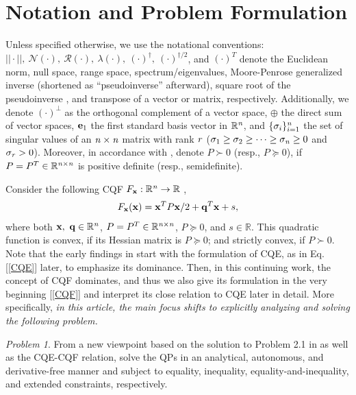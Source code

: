\documentclass[9pt,twocolumn,twoside,lineno]{pnas-new-1}
\newcommand{\beq}{\begin{eqnarray}}
\newcommand{\eeq}{\end{eqnarray}}
\newcommand{\bfx}{{\bf x}}
\newcommand{\bfq}{{\bf q}}
\newcommand{\bfe}{{\bf e}}
\newcommand{\real}{\mathbb{R}}
\newcommand{\calN}{{\mathcal N}}
\newcommand{\calR}{{\mathcal R}}
\newcommand{\itn}{{\it n}}
\newcommand{\itr}{{\it r}}
\theoremstyle{remark}
\newtheorem{problem}{Problem}[section]
\begin{document}
\section{Notation and Problem Formulation}
\label{Sec_Notation_Problem}
Unless specified otherwise, we use the notational conventions: $||\cdot||,~\calN(\cdot),~\calR(\cdot),~\lambda(\cdot),~(\cdot)^\dagger,~(\cdot)^{\dagger/2}$, and $(\cdot)^T$ denote the Euclidean norm, null space, range space, spectrum/eigenvalues, Moore-Penrose generalized inverse (shortened as ``pseudoinverse'' afterward), square root of the pseudoinverse \citep{UrBlDr:13}, and transpose of a vector or matrix, respectively. Additionally, we denote $(\cdot)^\perp$ as the orthogonal complement of a vector space, $\oplus$ the direct sum of vector spaces, $\bfe_1$ the first standard basis vector in $\real^\itn$, and $\{\sigma_i\}_{i=1}^\itn$ the set of singular values of an $\itn\times\itn$ matrix with rank $\itr$ ($\sigma_1\ge\sigma_2\ge\cdots\ge\sigma_\itn\ge 0$ and $\sigma_\itr>0$). Moreover, in accordance with \cite{Lu(Ye):03(16)}, denote $P\succ 0$ (resp., $P\succeq 0$), if $P=P^T\in\real^{{\it n}\times {\it n}}$ is positive definite (resp., semidefinite).

Consider the following CQF $F_\bfx: \real^\itn\rightarrow\real$ \citep{Lu(Ye):03(16)},
\beq
F_\bfx(\bfx)=\bfx^TP\bfx/2+\bfq^T\bfx+s,
\label{CQF}
\eeq
where both $\bfx,~\bfq\in\real^{\it n}$, $P=P^T\in\real^{{\it n}\times {\it n}}$, $P\succeq 0$, and $s\in\real$. This quadratic function is convex, if its Hessian matrix is $P\succeq 0$; and strictly convex, if $P\succ 0$. Note that the early findings in \cite{LiLiHs:20} start with the formulation of CQE, as in Eq. [\ref{CQE}] later, to emphasize its dominance. Then, in this continuing work, the concept of CQF dominates, and thus we also give its formulation in the very beginning [\ref{CQF}] and interpret its close relation to CQE later in detail. More specifically, \textit{in this article, the main focus shifts to explicitly analyzing and solving the following problem.}

\begin{problem}
From a new viewpoint based on the solution to Problem 2.1 in \cite{LiLiHs:20} as well as the CQE-CQF relation, solve the QPs in an analytical, autonomous, and derivative-free manner and subject to equality, inequality, equality-and-inequality, and extended constraints, respectively.
\label{Prob_Convex_Optimization}
\end{problem}
\end{document}
